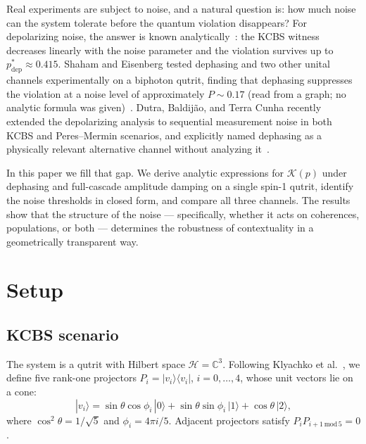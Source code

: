 \documentclass[twocolumn,showpacs,preprintnumbers,amsmath,amssymb,prl]{revtex4-2}
\newcommand{\ket}[1]{|#1\rangle}
\newcommand{\bra}[1]{\langle #1|}
\newcommand{\K}{\mathcal{K}}          %
\newcommand{\pstar}{p^{*}}            %
\begin{document}
Real experiments are subject to noise, and a natural question is: how much noise
can the system tolerate before the quantum violation disappears?
For depolarizing noise, the answer is known analytically~\cite{Klyachko2008,Dutra2026}:
the KCBS witness decreases linearly with the noise parameter and the violation
survives up to $\pstar_{\mathrm{dep}} \approx 0.415$.
Shaham and Eisenberg tested dephasing and two other unital channels experimentally
on a biphoton qutrit, finding that dephasing suppresses the violation at a noise
level of approximately $P \sim 0.17$ (read from a graph; no analytic formula was
given)~\cite{Shaham2014}.
Dutra, Baldij\~{a}o, and Terra Cunha recently extended the depolarizing analysis
to sequential measurement noise in both KCBS and Peres--Mermin scenarios, and
explicitly named dephasing as a physically relevant alternative channel without
analyzing it~\cite{Dutra2026}.

In this paper we fill that gap.
We derive analytic expressions for $\K(p)$ under dephasing and full-cascade
amplitude damping on a single spin-1 qutrit, identify the noise thresholds in
closed form, and compare all three channels.
The results show that the structure of the noise --- specifically, whether it
acts on coherences, populations, or both --- determines the robustness of
contextuality in a geometrically transparent way.

\section{Setup}
\label{sec:setup}

\subsection{KCBS scenario}

The system is a qutrit with Hilbert space $\mathcal{H} = \mathbb{C}^3$.
Following Klyachko et al.~\cite{Klyachko2008}, we define five rank-one projectors
$P_i = \ket{v_i}\bra{v_i}$, $i = 0,\ldots,4$, whose unit vectors lie on a cone:
\begin{equation}
  \ket{v_i} = \sin\theta\cos\phi_i\,\ket{0}
             + \sin\theta\sin\phi_i\,\ket{1}
             + \cos\theta\,\ket{2},
  \label{eq:projectors}
\end{equation}
where $\cos^2\theta = 1/\sqrt{5}$ and $\phi_i = 4\pi i/5$.
Adjacent projectors satisfy $P_i P_{i+1\,\mathrm{mod}\,5} = 0$.
\end{document}

